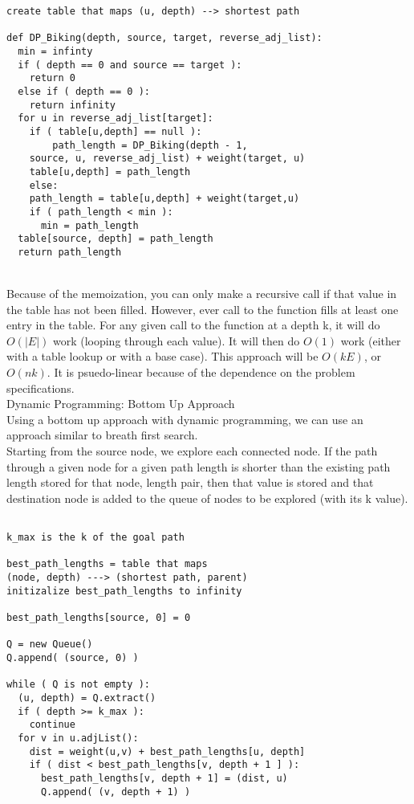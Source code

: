 \documentclass[12pt,twoside]{article}
\begin{document}
\begin{problems}
\begin{problemparts}
\begin{lstlisting}
create table that maps (u, depth) --> shortest path

def DP_Biking(depth, source, target, reverse_adj_list):
  min = infinty
  if ( depth == 0 and source == target ): 
    return 0
  else if ( depth == 0 ):
    return infinity
  for u in reverse_adj_list[target]:
    if ( table[u,depth] == null ):
    	path_length = DP_Biking(depth - 1, 
	source, u, reverse_adj_list) + weight(target, u)
	table[u,depth] = path_length
    else:
	path_length = table[u,depth] + weight(target,u)
    if ( path_length < min ):
      min = path_length
  table[source, depth] = path_length
  return path_length
\end{lstlisting}\\

Because of the memoization, you can only make a recursive call if that value in the table has not been filled.  However, ever call to the function fills at least one entry in the table.  For any given call to the function at a depth k, it will do $O(|E|)$ work (looping through each value).  It will then do $O(1)$ work  (either with a table lookup or with a base case).  This approach will be $O(kE)$, or $O(nk)$.  It is psuedo-linear because of the dependence on the problem specifications.\\
\problempart Dynamic Programming: Bottom Up Approach\\
Using a bottom up approach with dynamic programming, we can use an approach similar to breath first search.\\

Starting from the source node, we explore each connected node.  If the path through a given node for a given path length is shorter than the existing path length stored for that node, length pair, then that value is stored and that destination node is added to the queue of nodes to be explored (with its k value).\\

\begin{lstlisting}

k_max is the k of the goal path

best_path_lengths = table that maps 
(node, depth) ---> (shortest path, parent)
initizalize best_path_lengths to infinity

best_path_lengths[source, 0] = 0

Q = new Queue()
Q.append( (source, 0) )

while ( Q is not empty ):
  (u, depth) = Q.extract()
  if ( depth >= k_max ):
    continue
  for v in u.adjList():
    dist = weight(u,v) + best_path_lengths[u, depth]
    if ( dist < best_path_lengths[v, depth + 1 ] ):
      best_path_lengths[v, depth + 1] = (dist, u)
      Q.append( (v, depth + 1) )
\end{lstlisting}\\


\end{problemparts}
\end{problems}
\end{document}
